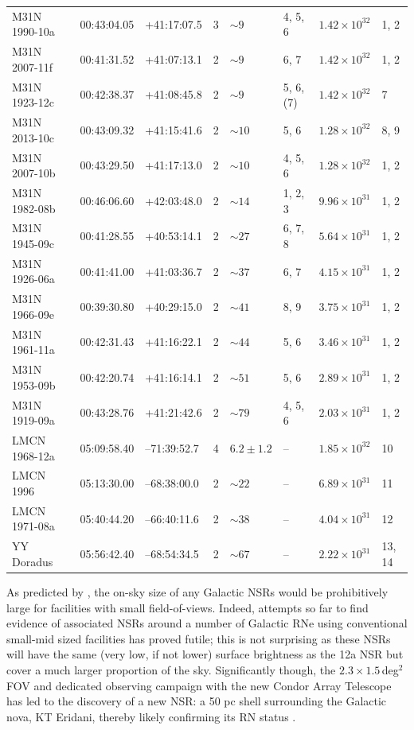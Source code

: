 \documentclass[fleqn,usenatbib]{mnras}
\begin{document}
\begin{table}
\begin{center}
\begin{tabular}{llllllll}
M31N 1990-10a & 00:43:04.05 & +41:17:07.5 & 3 & $\sim9$ & 4, 5, 6 & $1.42 \times 10^{32}$ & 1, 2\\
M31N 2007-11f & 00:41:31.52 & +41:07:13.1 & 2 & $\sim9$ & 6, 7 & $1.42 \times 10^{32}$ & 1, 2\\
M31N 1923-12c & 00:42:38.37 & +41:08:45.8 & 2 & $\sim9$ & 5, 6, (7) & $1.42 \times 10^{32}$ & 7 \\
M31N 2013-10c & 00:43:09.32 & +41:15:41.6 & 2 & $\sim10$ & 5, 6 & $1.28 \times 10^{32}$ & 8, 9 \\
M31N 2007-10b & 00:43:29.50 & +41:17:13.0 & 2 & $\sim10$ & 4, 5, 6 & $1.28 \times 10^{32}$ & 1, 2\\
M31N 1982-08b & 00:46:06.60 & +42:03:48.0 & 2 & $\sim14$ & 1, 2, 3 & $9.96 \times 10^{31}$ & 1, 2\\
M31N 1945-09c & 00:41:28.55 & +40:53:14.1 & 2 & $\sim27$ & 6, 7, 8 & $5.64 \times 10^{31}$ & 1, 2\\
M31N 1926-06a & 00:41:41.00 & +41:03:36.7 & 2 & $\sim37$ & 6, 7 & $4.15 \times 10^{31}$ & 1, 2\\
M31N 1966-09e & 00:39:30.80 & +40:29:15.0 & 2 & $\sim41$ & 8, 9 & $3.75 \times 10^{31}$ & 1, 2\\
M31N 1961-11a & 00:42:31.43 & +41:16:22.1 & 2 & $\sim44$ & 5, 6 & $3.46 \times 10^{31}$ & 1, 2\\
M31N 1953-09b & 00:42:20.74 & +41:16:14.1 & 2 & $\sim51$ & 5, 6 & $2.89 \times 10^{31}$ & 1, 2\\
M31N 1919-09a & 00:43:28.76 & +41:21:42.6 & 2 & $\sim79$ & 4, 5, 6 & $2.03 \times 10^{31}$ & 1, 2\\
\hline
LMCN 1968-12a & 05:09:58.40 & --71:39:52.7 & 4 & $6.2\pm1.2$ & -- & $1.85 \times 10^{32}$ & 10 \\
LMCN 1996 & 05:13:30.00 & --68:38:00.0 & 2 & $\sim22$ & -- & $6.89 \times 10^{31}$ & 11 \\
LMCN 1971-08a & 05:40:44.20 & --66:40:11.6 & 2 &$\sim38$ & -- & $4.04 \times 10^{31}$ & 12 \\
YY Doradus & 05:56:42.40 & --68:54:34.5 & 2 & $\sim67$ & -- & $2.22 \times 10^{31}$ & 13, 14 \\
\hline
\end{tabular}
\end{center}
\end{table}

As predicted by \citet{2023MNRAS.521.3004H}, the on-sky size of any Galactic NSRs would be prohibitively large for facilities with small field-of-views. Indeed, attempts so far to find evidence of associated NSRs around a number of Galactic RNe using conventional small-mid sized facilities has proved futile; this is not surprising as these NSRs will have the same (very low, if not lower) surface brightness as the 12a NSR but cover a much larger proportion of the sky. Significantly though, the $2.3 \times 1.5$\,deg$^2$ FOV and dedicated observing campaign with the new Condor Array Telescope \citep{2023PASP..135a5002L} has led to the discovery of a new NSR: a 50 pc shell surrounding the Galactic nova, KT Eridani, thereby likely confirming its RN status \citep{2023arXiv231017055S,2023arXiv231017258H}. 
\end{document}

